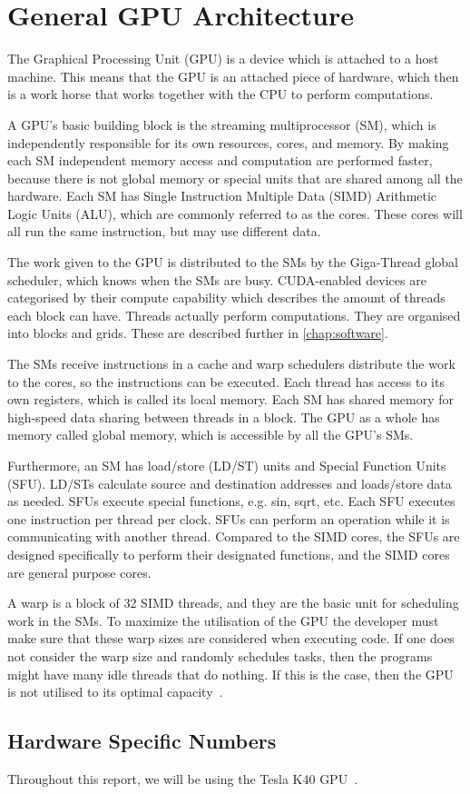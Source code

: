 \section{General GPU Architecture}
\label{sec:gpu}

The Graphical Processing Unit (GPU) is a device which is attached to a host machine.
This means that the GPU is an attached piece of hardware, which then is a work horse that works together with the CPU to perform computations.

A GPU's basic building block is the streaming multiprocessor (SM), which is independently responsible for its own resources, cores, and memory.
By making each SM independent memory access and computation are performed faster, because there is not global memory or special units that are shared among all the hardware.
Each SM has Single Instruction Multiple Data (SIMD) Arithmetic Logic Units (ALU), which are commonly referred to as the cores.
These cores will all run the same instruction, but may use different data.

The work given to the GPU is distributed to the SMs by the Giga-Thread global scheduler, which knows when the SMs are busy.
CUDA-enabled devices are categorised by their compute capability which describes the amount of threads each block can have.
Threads actually perform computations.
They are organised into blocks and grids.
These are described further in \cref{chap:software}.

The SMs receive instructions in a cache and warp schedulers distribute the work to the cores, so the instructions can be executed.
Each thread has access to its own registers, which is called its local memory.
Each SM has shared memory for high-speed data sharing between threads in a block.
The GPU as a whole has memory called global memory, which is accessible by all the GPU's SMs.

Furthermore, an SM has load/store (LD/ST) units and Special Function Units (SFU).
LD/STs calculate source and destination addresses and loads/store data as needed.
SFUs execute special functions, e.g. sin, sqrt, etc.
Each SFU executes one instruction per thread per clock.
SFUs can perform an operation while it is communicating with another thread.
Compared to the SIMD cores, the SFUs are designed specifically to perform their designated functions, and the SIMD cores are general purpose cores.

A warp is a block of 32 SIMD threads, and they are the basic unit for scheduling work in the SMs.
To maximize the utilisation of the GPU the developer must make sure that these warp sizes are considered when executing code.
If one does not consider the warp size and randomly schedules tasks, then the programs might have many idle threads that do nothing.
If this is the case, then the GPU is not utilised to its optimal capacity~\cite{fermi2009nvidia}.

\subsection{Hardware Specific Numbers}
\label{sec:hardware specific numbers}

Throughout this report, we will be using the Tesla K40 GPU~\cite{teslak402013nvidia}.
